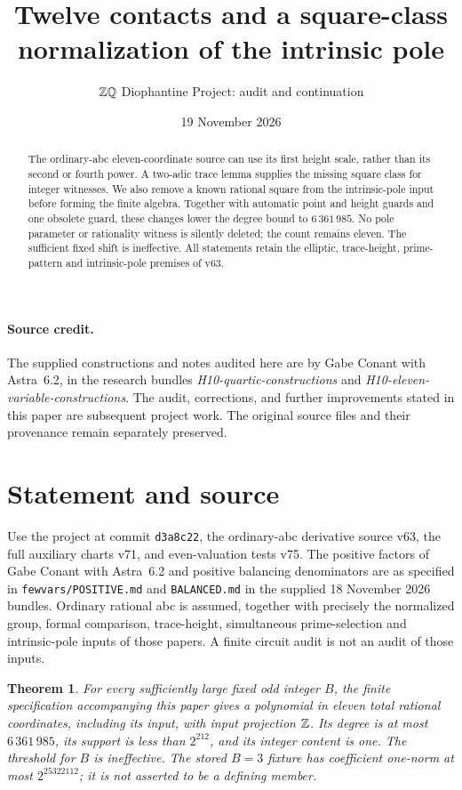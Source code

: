 \documentclass[11pt]{article}
\title{Twelve contacts and a square-class normalization of the intrinsic pole}
\author{\(\mathbb Z\mathbb Q\) Diophantine Project: audit and continuation}
\date{19 November 2026}
\newtheorem{theorem}{Theorem}
\begin{document}
\maketitle
\begin{abstract}
The ordinary-abc eleven-coordinate source can use its first height scale,
rather than its second or fourth power. A two-adic trace lemma supplies
the missing square class for integer witnesses. We also remove a known
rational square from the intrinsic-pole input before forming the finite
algebra. Together with automatic point and height guards and one obsolete guard,
these changes lower the degree bound to $6\,361\,985$. No pole parameter
or rationality witness is silently deleted; the count remains eleven.
The sufficient fixed shift is ineffective. All statements retain the
elliptic, trace-height, prime-pattern and intrinsic-pole premises of v63.
\end{abstract}

\paragraph{Source credit.}
The supplied constructions and notes audited here are by Gabe Conant with
Astra~6.2, in the research bundles
\emph{H10-quartic-constructions} and
\emph{H10-eleven-variable-constructions}.
The audit, corrections, and further improvements stated in this paper are
subsequent project work. The original source files and their provenance
remain separately preserved.

\section{Statement and source}

Use the project at commit \texttt{d3a8c22}, the ordinary-abc derivative
source v63, the full auxiliary charts v71, and even-valuation tests v75.
The positive factors of Gabe Conant with Astra~6.2 and positive balancing denominators are
as specified in \texttt{fewvars/POSITIVE.md} and \texttt{BALANCED.md}
in the supplied 18 November 2026 bundles. Ordinary rational abc is
assumed, together with precisely the normalized group, formal comparison,
trace-height, simultaneous prime-selection and intrinsic-pole inputs
of those papers. A finite circuit audit is not an audit of those inputs.

\begin{theorem}\label{thm:main}
For every sufficiently large fixed odd integer $B$, the finite
specification accompanying this paper gives a polynomial in eleven total
rational coordinates, including its input, with input projection $\mathbb Z$.
Its degree is at most $6\,361\,985$, its support is less than $2^{212}$,
and its integer content is one. The threshold for $B$ is ineffective.
The stored $B=3$ fixture has coefficient one-norm at most
$2^{25322112}$; it is not asserted to be a defining member.
\end{theorem}
\end{document}

